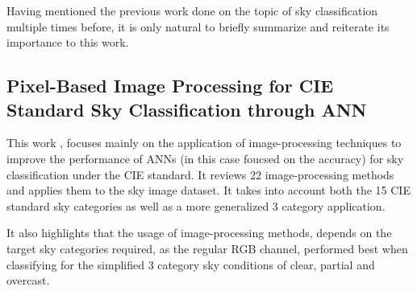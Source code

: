 Having mentioned the previous work done on the topic of sky classification multiple times before, it is only natural to briefly summarize and reiterate its importance to this work.

\subsection{Pixel-Based Image Processing for CIE Standard Sky
Classification through ANN}
This work \cite{skyClassANN-Granados-Lopéz}, focuses mainly on the application of image-processing techniques to improve the performance of ANNs (in this case foucsed on the accuracy) for sky classification under the CIE standard. It reviews 22 image-processing methods and applies them to the sky image dataset. It takes into account both the 15 CIE standard sky categories as well as a more generalized 3 category application. 

It also highlights that the usage of image-processing methods, depends on the target sky categories required, as the regular RGB channel, performed best when classifying for the simplified 3 category sky conditions of clear, partial and overcast.


